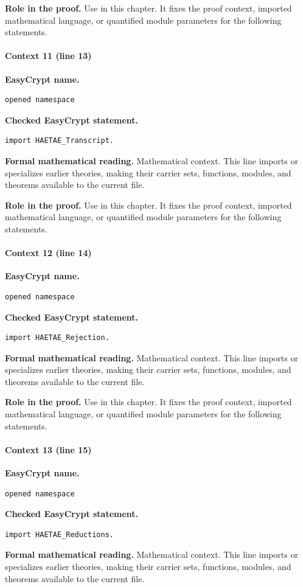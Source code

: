 \noindent\textbf{Role in the proof.}
Use in this chapter. It fixes the proof context, imported mathematical language, or quantified module parameters for the following statements.

\paragraph{Context 11 (line 13)}
\noindent\textbf{EasyCrypt name.}
\begin{lstlisting}[language=EasyCrypt,basicstyle=\ttfamily\scriptsize]
opened namespace
\end{lstlisting}
\noindent\textbf{Checked EasyCrypt statement.}
\begin{lstlisting}[language=EasyCrypt,basicstyle=\ttfamily\scriptsize]
import HAETAE_Transcript.
\end{lstlisting}
\noindent\textbf{Formal mathematical reading.}
Mathematical context. This line imports or specializes earlier theories, making their carrier sets, functions, modules, and theorems available to the current file.

\noindent\textbf{Role in the proof.}
Use in this chapter. It fixes the proof context, imported mathematical language, or quantified module parameters for the following statements.

\paragraph{Context 12 (line 14)}
\noindent\textbf{EasyCrypt name.}
\begin{lstlisting}[language=EasyCrypt,basicstyle=\ttfamily\scriptsize]
opened namespace
\end{lstlisting}
\noindent\textbf{Checked EasyCrypt statement.}
\begin{lstlisting}[language=EasyCrypt,basicstyle=\ttfamily\scriptsize]
import HAETAE_Rejection.
\end{lstlisting}
\noindent\textbf{Formal mathematical reading.}
Mathematical context. This line imports or specializes earlier theories, making their carrier sets, functions, modules, and theorems available to the current file.

\noindent\textbf{Role in the proof.}
Use in this chapter. It fixes the proof context, imported mathematical language, or quantified module parameters for the following statements.

\paragraph{Context 13 (line 15)}
\noindent\textbf{EasyCrypt name.}
\begin{lstlisting}[language=EasyCrypt,basicstyle=\ttfamily\scriptsize]
opened namespace
\end{lstlisting}
\noindent\textbf{Checked EasyCrypt statement.}
\begin{lstlisting}[language=EasyCrypt,basicstyle=\ttfamily\scriptsize]
import HAETAE_Reductions.
\end{lstlisting}
\noindent\textbf{Formal mathematical reading.}
Mathematical context. This line imports or specializes earlier theories, making their carrier sets, functions, modules, and theorems available to the current file.

